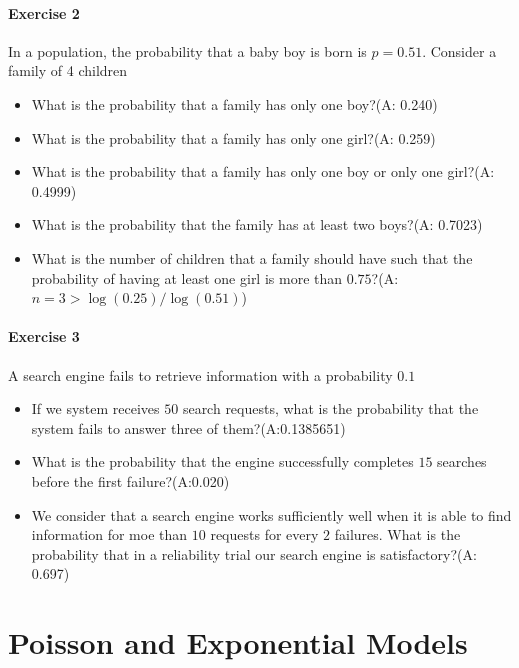 \documentclass[
]{book}
\providecommand{\tightlist}{%
  \setlength{\itemsep}{0pt}\setlength{\parskip}{0pt}}
\begin{document}
\hypertarget{exercise-2-4}{%
\subsubsection{Exercise 2}\label{exercise-2-4}}

In a population, the probability that a baby boy is born is \(p=0.51\). Consider a family of 4 children

\begin{itemize}
\tightlist
\item
  What is the probability that a family has only one boy?(A: 0.240)
\item
  What is the probability that a family has only one girl?(A: 0.259)
\item
  What is the probability that a family has only one boy or only one girl?(A: 0.4999)
\item
  What is the probability that the family has at least two boys?(A: 0.7023)
\item
  What is the number of children that a family should have such that the probability of having at least one girl is more than \(0.75\)?(A:\(n=3>\log(0.25)/\log(0.51)\))
\end{itemize}

\hypertarget{exercise-3-4}{%
\subsubsection{Exercise 3}\label{exercise-3-4}}

A search engine fails to retrieve information with a probability \(0.1\)

\begin{itemize}
\item
  If we system receives \(50\) search requests, what is the probability that the system fails to answer three of them?(A:0.1385651)
\item
  What is the probability that the engine successfully completes \(15\) searches before the first failure?(A:0.020)
\item
  We consider that a search engine works sufficiently well when it is able to find information for moe than \(10\) requests for every \(2\) failures. What is the probability that in a reliability trial our search engine is satisfactory?(A: 0.697)
\end{itemize}

\hypertarget{poisson-and-exponential-models}{%
\chapter{Poisson and Exponential Models}\label{poisson-and-exponential-models}}
\end{document}
